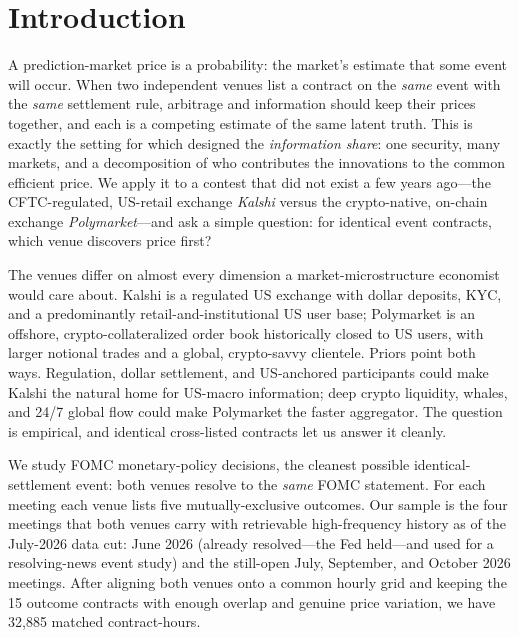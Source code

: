 \documentclass[12pt]{article}
\begin{document}
\section{Introduction}
A prediction-market price is a probability: the market's estimate that some event will
occur. When two independent venues list a contract on the \emph{same} event with the
\emph{same} settlement rule, arbitrage and information should keep their prices together,
and each is a competing estimate of the same latent truth. This is exactly the setting for
which \citet{hasbrouck1995} designed the \emph{information share}: one security, many
markets, and a decomposition of who contributes the innovations to the common efficient
price. We apply it to a contest that did not exist a few years ago---the CFTC-regulated,
US-retail exchange \emph{Kalshi} versus the crypto-native, on-chain exchange
\emph{Polymarket}---and ask a simple question: for identical event contracts, which venue
discovers price first?

The venues differ on almost every dimension a market-microstructure economist would care
about. Kalshi is a regulated US exchange with dollar deposits, KYC, and a
predominantly retail-and-institutional US user base; Polymarket is an offshore,
crypto-collateralized order book historically closed to US users, with larger notional
trades and a global, crypto-savvy clientele. Priors point both ways. Regulation, dollar
settlement, and US-anchored participants could make Kalshi the natural home for
US-macro information; deep crypto liquidity, whales, and 24/7 global flow could make
Polymarket the faster aggregator. The question is empirical, and identical cross-listed
contracts let us answer it cleanly.

We study FOMC monetary-policy decisions, the cleanest possible identical-settlement event:
both venues resolve to the \emph{same} FOMC statement. For each meeting each venue lists
five mutually-exclusive outcomes. Our sample is the four meetings that both venues carry
with retrievable high-frequency history as of the July-2026 data cut: June 2026 (already
resolved---the Fed held---and used for a resolving-news event study) and the still-open
July, September, and October 2026 meetings. After aligning both venues onto a common hourly
grid and keeping the 15 outcome contracts with enough overlap and genuine price variation,
we have 32{,}885 matched contract-hours.
\end{document}
